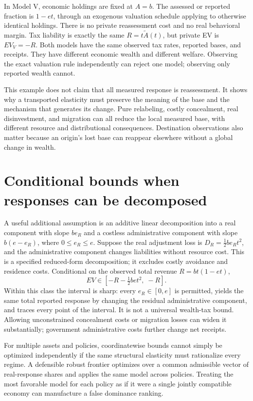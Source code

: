 \documentclass[11pt]{article}
\begin{document}
In Model V, economic holdings are fixed at $A=b$. The assessed or reported fraction is $1-et$, through an exogenous valuation schedule applying to otherwise identical holdings. There is no private reassessment cost and no real behavioral margin. Tax liability is exactly the same $R=t\widetilde A(t)$, but private EV is $EV_V=-R$. Both models have the same observed tax rates, reported bases, and receipts. They have different economic wealth and different welfare. Observing the exact valuation rule independently can reject one model; observing only reported wealth cannot.

This example does not claim that all measured response is reassessment. It shows why a transported elasticity must preserve the meaning of the base and the mechanism that generates its change. Pure relabeling, costly concealment, real disinvestment, and migration can all reduce the local measured base, with different resource and distributional consequences. Destination observations also matter because an origin's lost base can reappear elsewhere without a global change in wealth.

\section*{Conditional bounds when responses can be decomposed}
A useful additional assumption is an additive linear decomposition into a real component with slope $be_R$ and a costless administrative component with slope $b(e-e_R)$, where $0\leq e_R\leq e$. Suppose the real adjustment loss is $D_R=\tfrac12be_Rt^2$, and the administrative component changes liabilities without resource cost. This is a specified reduced-form decomposition; it excludes costly avoidance and residence costs. Conditional on the observed total revenue $R=b t(1-et)$,
\[
 EV\in[-R-\tfrac12bet^2,\;-R].
\]
Within this class the interval is sharp: every $e_R\in[0,e]$ is permitted, yields the same total reported response by changing the residual administrative component, and traces every point of the interval. It is not a universal wealth-tax bound. Allowing unconstrained concealment costs or migration losses can widen it substantially; government administrative costs further change net receipts.

For multiple assets and policies, coordinatewise bounds cannot simply be optimized independently if the same structural elasticity must rationalize every regime. A defensible robust frontier optimizes over a common admissible vector of real-response shares and applies the same model across policies. Treating the most favorable model for each policy as if it were a single jointly compatible economy can manufacture a false dominance ranking.
\end{document}
